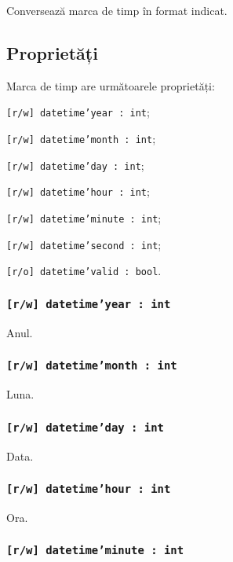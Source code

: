 Conversează marca de timp în format indicat.

\subsection{Proprietăți}

Marca de timp are următoarele proprietăți:
\begin{icItems}
	\item \texttt{[r/w] datetime'year : int};
	\item \texttt{[r/w] datetime'month : int};
	\item \texttt{[r/w] datetime'day : int};
	\item \texttt{[r/w] datetime'hour : int};
	\item \texttt{[r/w] datetime'minute : int};
	\item \texttt{[r/w] datetime'second : int};
	\item \texttt{[r/o] datetime'valid : bool}.
\end{icItems}

\subsubsection{\texttt{[r/w] datetime'year : int}}

Anul.

\subsubsection{\texttt{[r/w] datetime'month : int}}

Luna.

\subsubsection{\texttt{[r/w] datetime'day : int}}

Data.

\subsubsection{\texttt{[r/w] datetime'hour : int}}

Ora.

\subsubsection{\texttt{[r/w] datetime'minute : int}}

